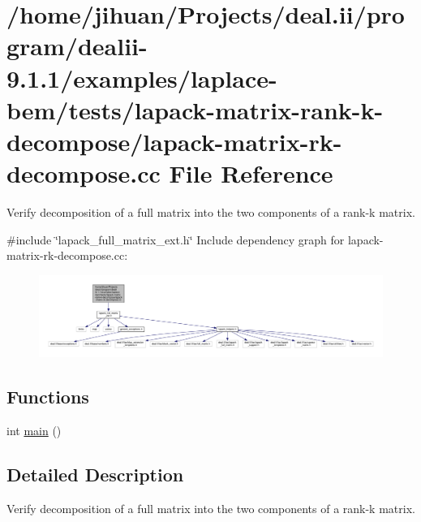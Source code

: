 \hypertarget{lapack-matrix-rk-decompose_8cc}{}\section{/home/jihuan/\+Projects/deal.ii/program/dealii-\/9.1.1/examples/laplace-\/bem/tests/lapack-\/matrix-\/rank-\/k-\/decompose/lapack-\/matrix-\/rk-\/decompose.cc File Reference}
\label{lapack-matrix-rk-decompose_8cc}


Verify decomposition of a full matrix into the two components of a rank-\/k matrix.  


{\ttfamily \#include \char`\"{}lapack\+\_\+full\+\_\+matrix\+\_\+ext.\+h\char`\"{}}\newline
Include dependency graph for lapack-\/matrix-\/rk-\/decompose.cc\+:\nopagebreak
\begin{figure}[H]
\begin{center}
\leavevmode
\includegraphics[width=350pt]{lapack-matrix-rk-decompose_8cc__incl}
\end{center}
\end{figure}
\subsection*{Functions}
\begin{DoxyCompactItemize}
\item 
int \hyperlink{lapack-matrix-rk-decompose_8cc_ae66f6b31b5ad750f1fe042a706a4e3d4}{main} ()
\end{DoxyCompactItemize}


\subsection{Detailed Description}
Verify decomposition of a full matrix into the two components of a rank-\/k matrix. 

